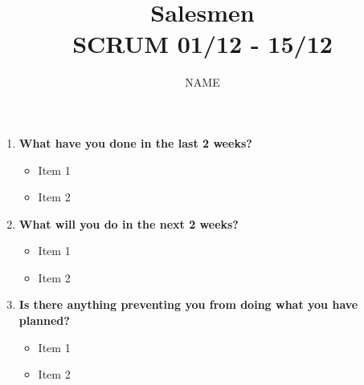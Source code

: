 \documentclass[a4paper, 12pt]{article}
\begin{document}
\title{Salesmen \\ SCRUM 01/12 - 15/12}
\author{NAME}
\date{}

\maketitle


\begin{enumerate}
	
	\item \textbf{What have you done in the last 2 weeks?}
	\begin{itemize}
		\item Item 1
		\item Item 2
		\\
	\end{itemize}
	
	\item \textbf{What will you do in the next 2 weeks?}
	\begin{itemize}
		\item Item 1
		\item Item 2
		\\
	\end{itemize}
	
	\item \textbf{Is there anything preventing you from doing what you have
	planned?}
	\begin{itemize}
		\item Item 1
		\item Item 2
		\\
	\end{itemize}
	
	
\end{enumerate}



		
\end{document}
